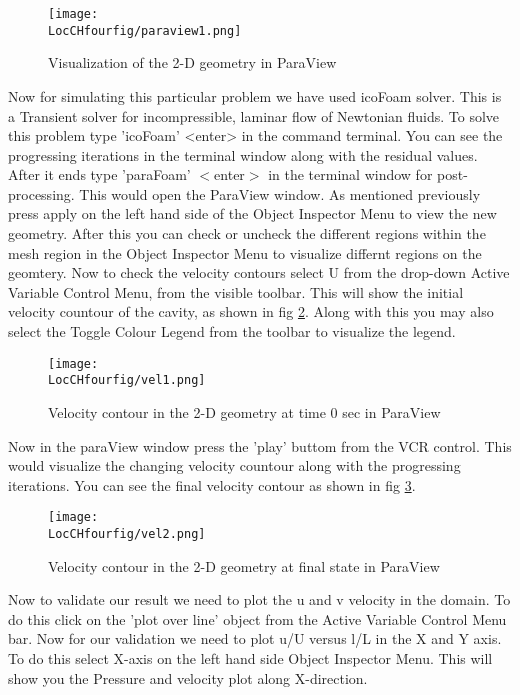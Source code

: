 \begin{figure}[ht]  
\begin{center}  
\texttt{[image: \\LocCHfourfig/paraview1.png]}
\caption{Visualization of the 2-D geometry in ParaView}
\label{paraview1}
\end{center}  
\end{figure}

\flushleft Now for simulating this particular problem we have used icoFoam solver. This is a Transient solver for incompressible, laminar flow of Newtonian fluids. To solve this problem type 'icoFoam' <enter> in the command terminal. You can see the progressing iterations in the terminal window along with the residual values. After it ends type 'paraFoam' $<$enter$>$ in the terminal window for post-processing. 
\flushleft This would open the ParaView window. As mentioned previously press apply on the left hand side of the Object Inspector Menu to view the new geometry. After this you can check or uncheck the different regions within the mesh region in  the Object Inspector Menu to visualize differnt regions on the geomtery. Now to check the velocity contours select U from the drop-down Active Variable Control Menu, from the visible toolbar. This will show the initial velocity countour of the cavity, as shown in fig \ref{vel1}. Along with this you may also select the Toggle Colour Legend from the toolbar to visualize the legend.

\begin{figure}[ht]  
\begin{center}  
\texttt{[image: \\LocCHfourfig/vel1.png]}
\caption{Velocity contour in the 2-D geometry at time 0 sec in ParaView}
\label{vel1}
\end{center}  
\end{figure}

\flushleft Now in the paraView window press the 'play' buttom from the VCR control. This would visualize the changing velocity countour along with the progressing iterations. You can see the final velocity contour as shown in fig \ref{vel2}.

\begin{figure}[ht]  
\begin{center}  
\texttt{[image: \\LocCHfourfig/vel2.png]}
\caption{Velocity contour in the 2-D geometry at final state in ParaView}
\label{vel2}
\end{center}  
\end{figure}

\flushleft Now to validate our result we need to plot the u and v velocity in the domain. To do this click on the 'plot over line' object from the  Active Variable Control Menu bar. Now for our validation we need to plot u/U versus l/L in the X and Y axis. To do this select X-axis on the left hand side  Object Inspector Menu. This will show you the Pressure and velocity plot along X-direction.

